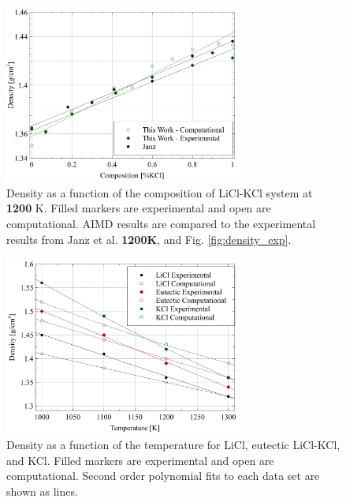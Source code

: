 \documentclass[review]{elsarticle}
\providecommand{\DIFaddtex}[1]{{\bf #1}} %
\providecommand{\DIFdeltex}[1]{} %
\providecommand{\DIFaddFL}[1]{\DIFadd{#1}} %
\providecommand{\DIFdelFL}[1]{\DIFdel{#1}} %
\providecommand{\DIFaddbeginFL}{} %
\providecommand{\DIFaddendFL}{} %
\providecommand{\DIFdelbeginFL}{} %
\providecommand{\DIFdelendFL}{} %
\providecommand{\DIFadd}[1]{\texorpdfstring{\DIFaddtex{#1}}{#1}} %
\providecommand{\DIFdel}[1]{\texorpdfstring{\DIFdeltex{#1}}{}} %
\newcommand{\DIFscaledelfig}{0.5}
\newlength{\DIFdelgraphicswidth} %
\newlength{\DIFdelgraphicsheight} %
\newcommand{\DIFaddincludegraphics}[2][]{{\color{blue}\fbox{\DIFOincludegraphics[#1]{#2}}}} %
\newcommand{\DIFdelincludegraphics}[2][]{%
\sbox{\DIFdelgraphicsbox}{\DIFOincludegraphics[#1]{#2}}%
\settoboxwidth{\DIFdelgraphicswidth}{\DIFdelgraphicsbox} %
\settoboxtotalheight{\DIFdelgraphicsheight}{\DIFdelgraphicsbox} %
\scalebox{\DIFscaledelfig}{%
\parbox[b]{\DIFdelgraphicswidth}{\usebox{\DIFdelgraphicsbox}\\[-\baselineskip] \rule{\DIFdelgraphicswidth}{0em}}\llap{\resizebox{\DIFdelgraphicswidth}{\DIFdelgraphicsheight}{%
\setlength{\unitlength}{\DIFdelgraphicswidth}%
\begin{picture}(1,1)%
\thicklines\linethickness{2pt} %
{\color[rgb]{1,0,0}\put(0,0){\framebox(1,1){}}}%
{\color[rgb]{1,0,0}\put(0,0){\line( 1,1){1}}}%
{\color[rgb]{1,0,0}\put(0,1){\line(1,-1){1}}}%
\end{picture}%
}\hspace*{3pt}}} %
} %
\DeclareRobustCommand{\DIFaddbeginFL}{\DIFOaddbeginFL \let\includegraphics\DIFaddincludegraphics} %
\DeclareRobustCommand{\DIFaddendFL}{\DIFOaddendFL \let\includegraphics\DIFOincludegraphics} %
\DeclareRobustCommand{\DIFdelbeginFL}{\DIFOdelbeginFL \let\includegraphics\DIFdelincludegraphics} %
\DeclareRobustCommand{\DIFdelendFL}{\DIFOaddendFL \let\includegraphics\DIFOincludegraphics} %
\begin{document}
\begin{figure}[h]
 \centering
 \DIFdelbeginFL %
\DIFdelendFL \DIFaddbeginFL \includegraphics[width=0.7\textwidth]{images/density_comp.jpg} 
 \DIFaddendFL \caption{Density as a function of the composition of LiCl-KCl system at \DIFdelbeginFL \DIFdelFL{1100 }\DIFdelendFL \DIFaddbeginFL \DIFaddFL{1200 }\DIFaddendFL K. Filled markers are experimental and open are computational. AIMD results are compared to the experimental results from \DIFdelbeginFL \DIFdelFL{Wang et al. \cite{Wang2015}, }\DIFdelendFL Janz et al. \DIFdelbeginFL \DIFdelFL{\cite{Janz1988} 1100K}\DIFdelendFL \DIFaddbeginFL \DIFaddFL{\cite{janz1975molten,van1955electrical} 1200K}\DIFaddendFL , and Fig. \ref{fig:density_exp}.}
 \label{fig:densityCompExp}
\end{figure} 


\begin{figure}[h]
 \centering
 \DIFdelbeginFL %
\DIFdelendFL \DIFaddbeginFL \includegraphics[width=0.7\textwidth]{images/density_temp_comp.jpg} 
 \DIFaddendFL \caption{Density as a function of the temperature for LiCl, eutectic LiCl-KCl, and KCl. Filled markers are experimental and open are computational. Second order polynomial fits to each data set are shown as lines. }
 \label{fig:densityCompTemp}
\end{figure} 
\FloatBarrier
\end{document}
